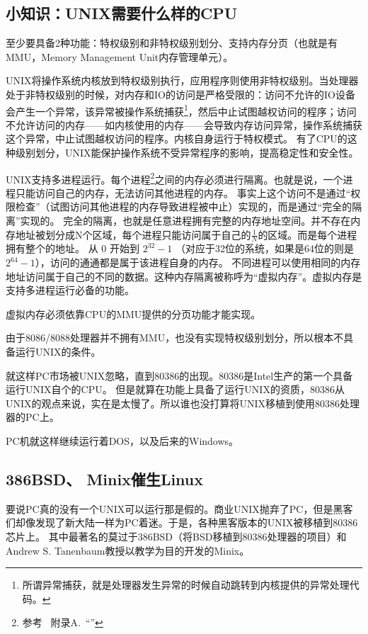 \documentclass[amstex,twoside]{ctexbook}
\newenvironment{insertnote}{ \ttfamily\CJKfamily{KaiTi} }{\vskip 1cm }
\newcommand{\faqref}[1]{~附录A.\nameref{FAQ}~“\nameref{#1}”}
\begin{document}
\begin{insertnote}
\subsection*{小知识：UNIX需要什么样的CPU}
至少要具备2种功能：特权级别和非特权级别划分、支持内存分页（也就是有MMU，Memory Management Unit内存管理单元）。

UNIX将操作系统内核放到特权级别执行，应用程序则使用非特权级别。当处理器处于非特权级别的时候，对内存和IO的访问是严格受限的：访问不允许的IO设备会产生一个异常，该异常被操作系统捕获\footnote{所谓异常捕获，就是处理器发生异常的时候自动跳转到内核提供的异常处理代码。}，然后中止试图越权访问的程序；访问不允许访问的内存——如内核使用的内存——会导致内存访问异常，操作系统捕获这个异常，中止试图越权访问的程序。内核自身运行于特权模式。
有了CPU的这种级别划分，UNIX能保护操作系统不受异常程序的影响，提高稳定性和安全性。

UNIX支持多进程运行。每个进程\footnote{参考 \faqref{FAQ:Process}}之间的内存必须进行隔离。也就是说，一个进程只能访问自己的内存，无法访问其他进程的内存。
事实上这个访问不是通过“权限检查”（试图访问其他进程的内存导致进程被中止）实现的，而是通过“完全的隔离”实现的。
完全的隔离，也就是任意进程拥有完整的内存地址空间。并不存在内存地址被划分成N个区域，每个进程只能访问属于自己的$ \frac{1}{N}$的区域。而是每个进程拥有整个的地址。
从 0 开始到 $2^{32}-1$ （对应于32位的系统，如果是64位的则是 $2^{64} - 1$），访问的通通都是属于该进程自身的内存。
不同进程可以使用相同的内存地址访问属于自己的不同的数据。这种内存隔离被称呼为“虚拟内存”。虚拟内存是支持多进程运行必备的功能。

虚拟内存必须依靠CPU的MMU提供的分页功能才能实现。
\end{insertnote}

由于8086/8088处理器并不拥有MMU，也没有实现特权级别划分，所以根本不具备运行UNIX的条件。

就这样PC市场被UNIX忽略，直到80386的出现。80386是Intel生产的第一个具备运行UNIX自个的CPU。
但是就算在功能上具备了运行UNIX的资质，80386从UNIX的观点来说，实在是太慢了。所以谁也没打算将UNIX移植到使用80386处理器的PC上。

PC机就这样继续运行着DOS，以及后来的Windows。

\subsection{386BSD、 Minix催生Linux}

要说PC真的没有一个UNIX可以运行那是假的。商业UNIX抛弃了PC，但是黑客们却像发现了新大陆一样为PC着迷。于是，各种黑客版本的UNIX被移植到80386芯片上。
其中最著名的莫过于386BSD（将BSD移植到80386处理器的项目）和Andrew S. Tanenbaum教授以教学为目的开发的Minix。
\end{document}

